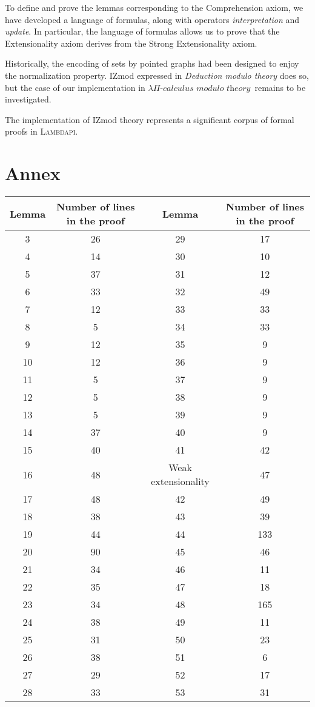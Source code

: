\documentclass[submission,copyright,creativecommons]{eptcs}
\newcommand{\lpcm}{$\lambda \Pi\textit{-calculus modulo theory}$}
\begin{document}
To define and prove the lemmas corresponding to the Comprehension axiom, we have developed a language of formulas, along with operators \textit{interpretation} and \textit{update}. In particular, the language of formulas allows us to prove that the Extensionality axiom derives from the Strong Extensionality axiom.

Historically, the encoding of sets by pointed graphs had been designed to enjoy the normalization property. IZmod expressed in \textit{Deduction modulo theory} does so, but the case of our implementation in \lpcm ~remains to be investigated.

The implementation of IZmod theory represents a significant corpus of formal proofs in \textsc{Lambdapi}.

\newpage
\section*{Annex}

\begin{center}
\begin{tabular}{|c|c||c|c|}
\hline Lemma & Number of lines in the proof & Lemma & Number of lines in the proof \\
\hline 3 & 26 & 29 & 17 \\
\hline 4 & 14 & 30 & 10 \\
\hline 5 & 37 & 31 & 12 \\
\hline 6 & 33 & 32 & 49 \\
\hline 7 & 12 & 33 & 33 \\
\hline 8 & 5 & 34 & 33 \\
\hline 9 & 12 & 35 & 9 \\
\hline 10 & 12 & 36 & 9 \\
\hline 11 & 5 & 37 & 9 \\
\hline 12 & 5 & 38 & 9 \\
\hline 13 & 5 & 39 & 9 \\
\hline 14 & 37 & 40 & 9 \\
\hline 15 & 40 & 41 & 42 \\
\hline 16 & 48 & Weak extensionality & 47 \\
\hline 17 & 48 & 42 & 49 \\
\hline 18 & 38 & 43 & 39 \\
\hline 19 & 44 & 44 & 133 \\
\hline 20 & 90 & 45 & 46 \\
\hline 21 & 34 & 46 & 11 \\
\hline 22 & 35 & 47 & 18 \\
\hline 23 & 34 & 48 & 165 \\
\hline 24 & 38 & 49 & 11 \\
\hline 25 & 31 & 50 & 23 \\
\hline 26 & 38 & 51 & 6 \\
\hline 27 & 29 & 52 & 17 \\
\hline 28 & 33 & 53 & 31 \\
\hline
\end{tabular}
\end{center}






\end{document}
